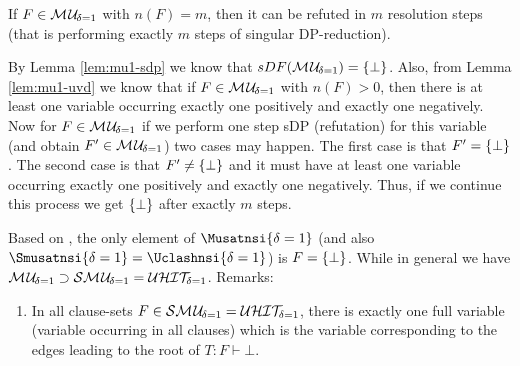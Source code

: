 \documentclass{report}
\begin{document}
\begin{lem}\label{lem:mu1-refu-tree}
If $F \in \mathcal{M\hspace{0.8pt}U}_{\!\delta=1}$ with $n(F)=m$, then it can be refuted in $m$ resolution steps (that is performing exactly $m$ steps of singular DP-reduction).
\end{lem}
\begin{prf}
By Lemma \ref{lem:mu1-sdp} we know that $sDF(\mathcal{M\hspace{0.8pt}U}_{\!\delta=1})=\{ \bot \}$. Also, from Lemma \ref{lem:mu1-uvd} we know that if $F \in \mathcal{M\hspace{0.8pt}U}_{\!\delta=1}$ with $n(F) > 0$, then there is at least one variable occurring exactly one positively and exactly one negatively. Now for $F \in \mathcal{M\hspace{0.8pt}U}_{\!\delta=1}$ if we perform one step sDP (refutation) for this variable (and obtain $F' \in \mathcal{M\hspace{0.8pt}U}_{\!\delta=1}$) two cases may happen. The first case is that $F' =\{ \bot \}$. The second case is that $F' \not = \{ \bot \}$ and it must have at least one variable occurring exactly one positively and exactly one negatively. Thus, if we continue this process we get $\{ \bot \}$ after exactly $m$ steps. 
\end{prf}

\begin{lem}\label{lem:mu1-sma-uhit}
Based on \cite{KullmannZhao2010Extremal}, the only element of $\Musatnsi{\delta=1}$ (and also $\Smusatnsi{\delta=1} = \Uclashnsi{\delta=1}$) is $F=\{ \bot \}$. While in general we have $\mathcal{M\hspace{0.8pt}U}_{\!\delta=1} \supset \mathcal{S}\mathcal{M\hspace{0.8pt}U}_{\!\delta=1} = \mathcal{U}\mathcal{HIT}_{\!\!\delta=1}$.
Remarks:
  \begin{enumerate}
  \item In all clause-sets $F \in \mathcal{S}\mathcal{M\hspace{0.8pt}U}_{\!\delta=1} = \mathcal{U}\mathcal{HIT}_{\!\!\delta=1}$, there is exactly one full variable (variable occurring in all clauses) which is the variable corresponding to the edges leading to the root of $T:F \vdash \bot$.
  \end{enumerate} 
\end{lem}
\end{document}
